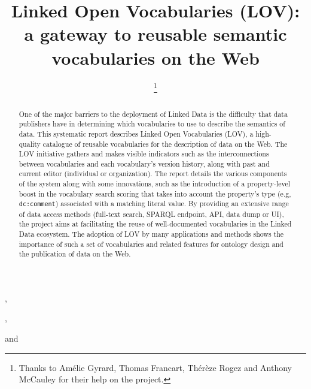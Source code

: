 \documentclass{iosart2c}
\begin{document}
\begin{frontmatter}                        %

%
\title{Linked Open Vocabularies (LOV): a gateway to reusable semantic vocabularies on the Web}





\author[A]{ \thanks{Thanks to Am\'elie Gyrard, Thomas Francart, Th\'er\`{e}ze Rogez and Anthony McCauley for their help on the project.}},
\author[B]{ },
\author[C]{ }
and
\author[D]{ }
\address[A]{Fujitsu (Ireland) Limited, Swords, Co. Dublin, Ireland\\
E-mail: pierre-yves.vandenbussche@ie.fujitsu.com}
\address[B]{Mondeca, 35 boulevard de Strasbourg, 75010 Paris, France\\
E-mail: ghislain.atemezing@mondeca.com}
\address[C]{Ontology Engineering Group (OEG), 
Universidad Polit\'ecnica de Madrid, Madrid, Spain\\
E-mail: mpoveda@fi.upm.es}
\address[D]{Mondeca, 35 boulevard de Strasbourg, 75010 Paris, France
\\
E-mail: bernard.vatant@mondeca.com}



\begin{abstract}

One of the major barriers to the deployment of 
Linked Data is the difficulty that data publishers have in determining which vocabularies to use to describe the semantics of data. This systematic report describes Linked Open Vocabularies (LOV), a high-quality catalogue of reusable vocabularies for the description of data on the Web. The LOV initiative gathers and makes visible indicators such as the interconnections between vocabularies and each vocabulary's version history, along with past and current editor (individual or organization). The report details the various components of the system along with some innovations, such as the introduction of a property-level boost in the vocabulary search scoring that takes into account the property's type (e.g, \texttt{dc:comment}) associated with a matching literal value. By providing an extensive range of data access methods (full-text search, SPARQL endpoint, API, data dump or UI), the project aims at facilitating the reuse of well-documented vocabularies in the Linked Data ecosystem. The adoption of LOV by many applications and methods shows the importance of such a set of vocabularies and related features for ontology design and the publication of data on the Web.


\end{abstract}
\end{frontmatter}
\end{document}
